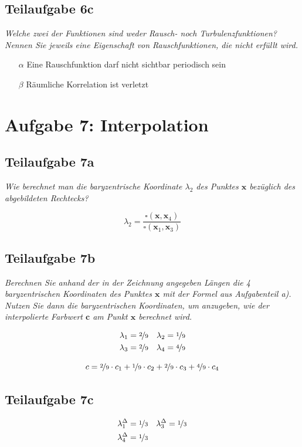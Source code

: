 \documentclass[a4paper]{scrartcl}
\begin{document}
\subsection*{Teilaufgabe 6c}
\textit{Welche zwei der Funktionen sind weder Rausch- noch Turbulenzfunktionen?
Nennen Sie jeweils eine Eigenschaft von Rauschfunktionen, die nicht erfüllt
wird.}

\begin{itemize}
    \item[$\alpha$] Eine Rauschfunktion darf nicht sichtbar periodisch sein
    \item[$\beta$] Räumliche Korrelation ist verletzt
\end{itemize}

\section*{Aufgabe 7: Interpolation}
\subsection*{Teilaufgabe 7a}
\textit{Wie berechnet man die baryzentrische Koordinate $\lambda_2$ des Punktes $\mathbf{x}$ bezüglich des
abgebildeten Rechtecks?}

\[\lambda_2 = \frac{\square(\mathbf{x}, \mathbf{x}_4)}{\square(\mathbf{x}_1, \mathbf{x}_3)}\]

\subsection*{Teilaufgabe 7b}
\textit{Berechnen Sie anhand der in der Zeichnung angegeben Längen die 4 baryzentrischen
Koordinaten des Punktes $\mathbf{x}$ mit der Formel aus Aufgabenteil a). Nutzen Sie dann
die baryzentrischen Koordinaten, um anzugeben, wie der interpolierte Farbwert $\mathbf{c}$ am
Punkt $\mathbf{x}$ berechnet wird.}

\begin{align}
    \lambda_1 &= \nicefrac{2}{9}  & \lambda_2 &= \nicefrac{1}{9}\\
    \lambda_3 &= \nicefrac{2}{9}  & \lambda_4 &= \nicefrac{4}{9}
\end{align}

\[c = \nicefrac{2}{9} \cdot c_1 + \nicefrac{1}{9} \cdot c_2 + \nicefrac{2}{9} \cdot c_3 + \nicefrac{4}{9} \cdot c_4\]

\subsection*{Teilaufgabe 7c}
\begin{align}
    \lambda_1^\Delta &= \nicefrac{1}{3}  & \lambda_3^\Delta &= \nicefrac{1}{3}\\
    \lambda_4^\Delta &= \nicefrac{1}{3}
\end{align}
\end{document}
